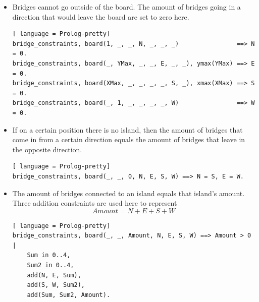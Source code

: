 \documentclass{report}
\begin{document}
\begin{itemize}
\item Bridges cannot go outside of the board. The amount of bridges going in a direction that would leave the board are set to zero here.
\begin{lstlisting}[ language = Prolog-pretty]
bridge_constraints, board(1, _, _, N, _, _, _)                ==> N = 0.
bridge_constraints, board(_, YMax, _, _, E, _, _), ymax(YMax) ==> E = 0.
bridge_constraints, board(XMax, _, _, _, _, S, _), xmax(XMax) ==> S = 0.
bridge_constraints, board(_, 1, _, _, _, _, W)                ==> W = 0.
\end{lstlisting}
\item If on a certain position there is no island, then the amount of bridges that come in from a certain direction equals the amount of bridges that leave in the opposite direction.
\begin{lstlisting}[ language = Prolog-pretty]
bridge_constraints, board(_, _, 0, N, E, S, W) ==> N = S, E = W.
\end{lstlisting}
\item The amount of bridges connected to an island equals that island's amount. Three addition constraints are used here to represent \[ Amount = N + E + S + W \]
\newpage
	    \begin{lstlisting}[ language = Prolog-pretty]
bridge_constraints, board(_, _, Amount, N, E, S, W) ==> Amount > 0 |
    Sum in 0..4,
    Sum2 in 0..4,
    add(N, E, Sum),
    add(S, W, Sum2),
    add(Sum, Sum2, Amount).
\end{lstlisting}
\end{itemize}
\end{document}
